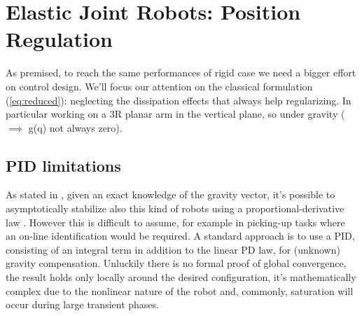 \section{Elastic Joint Robots: Position Regulation}
As premised, to reach the same performances of rigid case we need a bigger effort on control design. We'll focus our attention on the classical formulation (\ref{eq:reduced}): neglecting the dissipation effects that always help regularizing. In particular working on a 3R planar arm in the vertical plane, so under gravity ($\implies$ g(q) not always zero). 
\subsection{PID limitations}
As stated in \cite{deluca93}, given an exact knowledge of the gravity vector, it's possible to asymptotically stabilize also this kind of robots using a proportional-derivative law \cite{simplepd}. However this is difficult to assume, for example in picking-up tasks where an on-line identification would be required. A standard approach is to use a PID, consisting of an integral term in addition to the linear PD law, for (unknown) gravity compensation. Unluckily there is no formal proof of global convergence, the result holds only locally around the desired configuration, it's mathematically complex due to the nonlinear nature of the robot and, commonly, saturation will occur during large transient phases.
